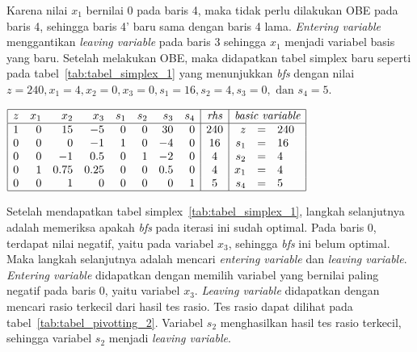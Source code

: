 Karena nilai \(x_1\) bernilai 0 pada baris 4, maka tidak perlu dilakukan OBE pada baris 4, sehingga baris 4' baru sama dengan baris 4 lama. \textit{Entering variable} menggantikan \textit{leaving variable} pada baris 3 sehingga \(x_1\) menjadi variabel basis yang baru. Setelah melakukan OBE, maka didapatkan tabel simplex baru seperti pada tabel~\ref{tab:tabel_simplex_1} yang menunjukkan \textit{bfs} dengan nilai \(z=240, x_1=4, x_2=0, x_3=0, s_1=16, s_2=4, s_3=0, \text{ dan } s_4=5\).

\begin{center}
	\label{tab:tabel_simplex_1}
	$
	\begin{array}{|r r r r r r r r|c|r c l|}
		\hline
		z & x_1 & x_2 & x_3 & s_1 & s_2 & s_3 & s_4 & \textit{rhs} & \multicolumn{3}{c|}{\textit{basic variable}}\\
		\hline
		1 & 0 & 15 & -5 & 0 & 0 & 30 & 0 & 240 & z & = & 240\\
		0 & 0 & 0 & -1 & 1 & 0 & -4 & 0 & 16 & s_1 & = & 16\\
		0 & 0 & -1 & 0.5 & 0 & 1 & -2 & 0 & 4 & s_2 & = & 4\\
		0 & 1 & 0.75 & 0.25 & 0 & 0 & 0.5 & 0 & 4 & x_1 & = & 4\\
		0 & 0 & 1 & 0 & 0 & 0 & 0 & 1 & 5 & s_4 & = & 5\\
		\hline
	\end{array}
	$
\end{center}

Setelah mendapatkan tabel simplex~\ref{tab:tabel_simplex_1}, langkah selanjutnya adalah memeriksa apakah \textit{bfs} pada iterasi ini sudah optimal. Pada baris 0, terdapat nilai negatif, yaitu pada variabel \(x_3\), sehingga \textit{bfs} ini belum optimal. Maka  langkah selanjutnya adalah mencari \textit{entering variable} dan \textit{leaving variable}. \textit{Entering variable} didapatkan dengan memilih variabel yang bernilai paling negatif pada baris 0, yaitu variabel \(x_3\). \textit{Leaving variable} didapatkan dengan mencari rasio terkecil dari hasil tes rasio. Tes rasio dapat dilihat pada tabel~\ref{tab:tabel_pivotting_2}. Variabel \(s_2\) menghasilkan hasil tes rasio terkecil, sehingga variabel \(s_2\) menjadi \textit{leaving variable}.

